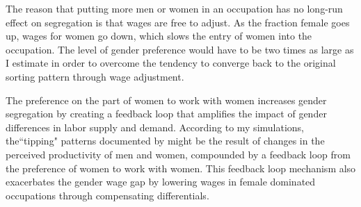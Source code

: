\documentclass[12pt]{article}
\begin{document}


The reason that putting more men or women in an occupation has no long-run effect on segregation is that wages are free to adjust. As the fraction female goes up, wages for women go down, which slows the entry of women into the occupation. The level of gender preference would have to be two times as large as I estimate in order to overcome the tendency to converge back to the original sorting pattern through wage adjustment.



The preference on the part of women to work with women increases gender segregation by creating a feedback loop that amplifies the impact of gender differences in labor supply and demand. According to my simulations, the``tipping" patterns documented by  might be the result of changes in the perceived productivity of men and women, compounded by a feedback loop from the preference of women to work with women. This feedback loop mechanism also exacerbates the gender wage gap by lowering wages in female dominated occupations through compensating differentials.
\end{document}
